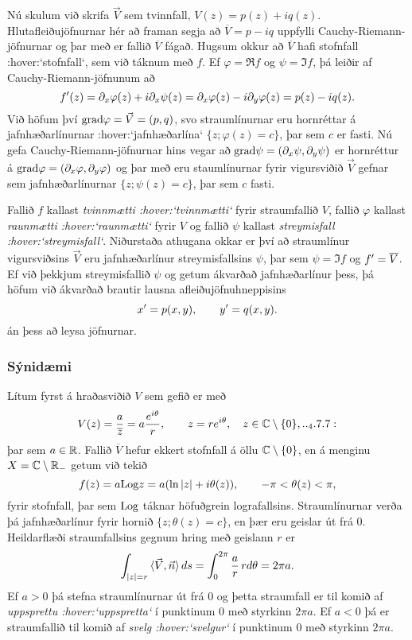 \smallskip 
Nú skulum við skrifa $\vec V$ sem tvinnfall,
$V(z)=p(z)+iq(z)$.  Hlutafleiðujöfnurnar hér að framan
segja að $\overline  V=p-iq$
uppfylli Cauchy-Riemann-jöfnurnar og þar með er
fallið  $\overline V$ fágað.  Hugsum okkur að $\overline V$
hafi stofnfall :hover:`stofnfall`, sem við táknum með $f$. 
Ef ${\varphi}=\Re f$ og
${\psi}=\Im f$, þá leiðir af Cauchy-Riemann-jöfnunum að 
 $$
f{\sp{\prime}}(z)=\partial_x\varphi(z)+i\partial_x\psi(z)
=\partial_x\varphi(z)-i\partial_y\varphi(z)
=p(z)-iq(z).
 $$
Við höfum því ${\operatorname{grad}}\varphi=\vec V=(p,q)$, svo straumlínurnar eru
hornréttar á jafnhæðarlínurnar :hover:`jafnhæðarlína`
$\{z; \varphi(z)=c\}$, þar sem $c$ er fasti.  Nú gefa
Cauchy-Riemann-jöfnurnar hins vegar að ${\operatorname{grad}} \psi=(\partial_x\psi,
\partial_y\psi)$ er hornréttur á ${\operatorname{grad}}\varphi=(\partial_x\varphi,
\partial_y\varphi)$ og þar með eru staumlínurnar fyrir vigursviðið
$\vec V$ gefnar sem jafnhæðarlínurnar $\{z; \psi(z)=c\}$, þar sem
$c$ fasti.

Fallið $f$ kallast {\it tvinnmætti :hover:`tvinnmætti`} fyrir straumfallið $V$, fallið
$\varphi$ kallast {\it raunmætti :hover:`raunmætti`} fyrir  $V$ og fallið $\psi$
kallast {\it streymisfall :hover:`streymisfall`}.  Niðurstaða athugana okkar er því að
straumlínur vigursviðsins $\vec V$ eru jafnhæðarlínur
streymisfallsins $\psi$, þar sem $\psi= \Im f$ og $f{\sp{\prime}} = \overline
V$.  Ef við þekkjum streymisfallið ${\psi}$ og getum ákvarðað
jafnhæðarlínur þess, þá höfum við ákvarðað brautir lausna
afleiðujöfnuhneppisins 
\begin{equation*}
x{\sp{\prime}}=p(x,y), \qquad y{\sp{\prime}}=q(x,y).
\end{equation*}
án þess að leysa jöfnurnar.

\subsubsection{Sýnidæmi}  Lítum fyrst á hraðasviðið $V$ sem gefið er með 
 \begin{equation*}V(z)=\dfrac a{\overline z}= a\dfrac {e\sp{i\theta}}r, \qquad
z=re\sp{i\theta}, \quad z\in \C\setminus\set 0,


.. _4.7.7:

 \end{equation*}
þar sem $a\in {\mathbb R}$. Fallið $\overline V$ hefur ekkert stofnfall á öllu 
${\mathbb C}\setminus {\{0\}}$, en á menginu $X={\mathbb C}\setminus {\mathbb R}_-$ getum við tekið 
 $$f(z)=a{\operatorname{Log}} z=a(\ln |z|+i\theta(z)),  \qquad -\pi<\theta(z)<\pi,
 $$
fyrir stofnfall, þar sem ${\operatorname{Log}}$ táknar höfuðgrein lografallsins.
Straumlínurnar verða þá jafnhæðarlínur fyrir hornið $\{z;
\theta(z)=c\}$, en þær eru geislar út frá $0$.  Heildarflæði
straumfallsins gegnum hring með geislann $r$ er
 $$\int_{|z|=r}{\langle\vec V,\vec n\rangle} \, ds=
\int_0\sp{2\pi}\dfrac ar \, rd\theta=2\pi a.
 $$
Ef $a>0$ þá stefna straumlínurnar út frá $0$ og 
þetta straumfall er til komið af {\it uppsprettu :hover:`uppspretta`} í
punktinum $0$ með styrkinn $2\pi a$. Ef $a<0$ þá er 
straumfallið  til komið af {\it svelg :hover:`svelgur`} í punktinum $0$
með styrkinn $2\pi a$.  


